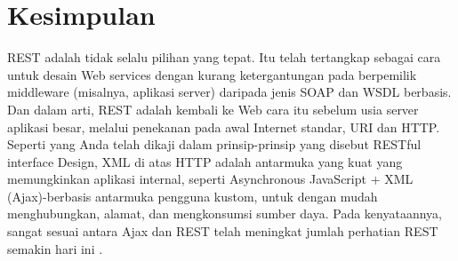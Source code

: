 \section{Kesimpulan}
REST adalah tidak selalu pilihan yang tepat. Itu telah tertangkap sebagai cara untuk desain Web services dengan kurang ketergantungan pada berpemilik middleware (misalnya, aplikasi server) daripada jenis SOAP dan WSDL berbasis. Dan dalam arti, REST adalah kembali ke Web cara itu sebelum usia server aplikasi besar, melalui penekanan pada awal Internet standar, URI dan HTTP. Seperti yang Anda telah dikaji dalam prinsip-prinsip yang disebut RESTful interface Design, XML di atas HTTP adalah antarmuka yang kuat yang memungkinkan aplikasi internal, seperti Asynchronous JavaScript + XML (Ajax)-berbasis antarmuka pengguna kustom, untuk dengan mudah menghubungkan, alamat, dan mengkonsumsi sumber daya. Pada kenyataannya, sangat sesuai antara Ajax dan REST telah meningkat jumlah perhatian REST semakin hari ini \cite{rodriguez2008restful}.


